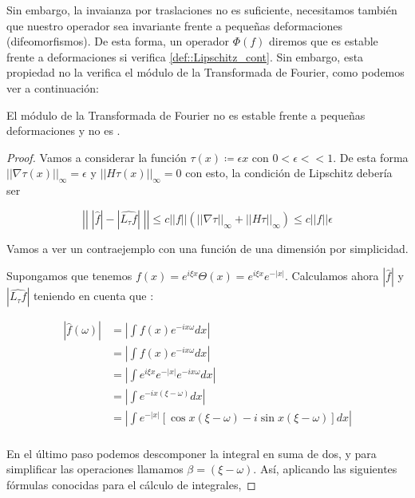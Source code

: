 \medskip
    
\noindent Sin embargo, la invaianza por traslaciones no es suficiente, necesitamos también que nuestro operador sea invariante frente a pequeñas deformaciones (difeomorfismos). De esta forma, un operador $\Phi(f)$ diremos que es estable frente a deformaciones si verifica \autoref{def::Lipschitz_cont}. Sin embargo, esta propiedad no la verifica el módulo de la Transformada de Fourier, como podemos ver a continuación:

\begin{lema} \label{lemma:TF_inestable_difeomorfismos}
El módulo de la Transformada de Fourier no es estable frente a pequeñas deformaciones y no es .
\end{lema}

\begin{proof}
\noindent Vamos a considerar la función $\tau(x)\coloneqq \epsilon x$ con $0 < \epsilon << 1$. De esta forma $||\nabla \tau (x) ||_\infty = \epsilon$ y $||H\tau(x)||_\infty=0$ con esto, la condición de Lipschitz debería ser

$$\left|\left| \; |\widehat{f}| -|\widehat{L_\tau f}| \; \right|\right| \leq c ||f|| (||\nabla \tau ||_{\infty} + ||H\tau||_\infty) \leq c ||f|| \epsilon$$

\noindent Vamos a ver un contraejemplo con una función de una dimensión por simplicidad.

\medskip

\noindent Supongamos que tenemos $f(x)=e^{i \xi x} \Theta(x)=e^{i \xi x}e^{-|x|}$. Calculamos ahora $|\widehat{f}|$ y $|\widehat{L_\tau f}|$ teniendo en cuenta que :


\begin{align*}
  |\widehat{f}(\omega)|&=\left|  \int{f(x)e^{-ix\omega}dx}  \right | \\
  &=\left|  \int{f(x)e^{-ix\omega}dx}  \right | \\
  &=\left|  \int{e^{i \xi x}e^{-|x|}e^{-ix\omega}dx}  \right | \\
  &=\left|  \int{e^{-ix(\xi-\omega)}dx}  \right | \\
  &=\left|  \int{e^{-|x|}\left[\cos{x(\xi-\omega)} -i\sin{x(\xi-\omega)}\right]dx} \right| \\
\end{align*}

\noindent En el último paso podemos descomponer la integral en suma de dos, y para simplificar las operaciones llamamos $\beta=(\xi - \omega)$. Así, aplicando las siguientes fórmulas conocidas para el cálculo de integrales,



\end{proof}
